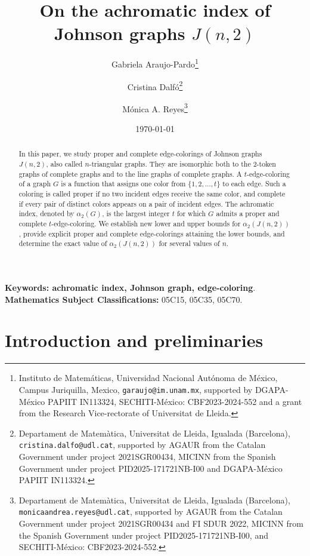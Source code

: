 \documentclass{article}
\title{On the achromatic index of Johnson graphs $J(n,2)$ %
}
\date{\today}
\begin{document}
\author{Gabriela Araujo-Pardo\thanks{Instituto de Matem\'aticas, Universidad Nacional Aut\'onoma de M\'exico, Campus Juriquilla, Mexico, {\tt garaujo@im.unam.mx}, supported by DGAPA-M\'exico PAPIIT IN113324, SECHITI-M\'exico: CBF2023-2024-552 and a grant from the Research Vice-rectorate of Universitat de Lleida.}
    \and
	Cristina Dalf\'o\thanks{Departament de Matem\`atica, Universitat de Lleida, Igualada (Barcelona), {\tt cristina.dalfo@udl.cat}, supported by AGAUR from the Catalan Government under project 2021SGR00434, MICINN from the Spanish Government under project PID2025-171721NB-I00 and DGAPA-M\'exico PAPIIT IN113324.}
    \and
    M\'onica A. Reyes\thanks{Departament de Matem\`atica, Universitat de Lleida, Igualada (Barcelona), {\tt monicaandrea.reyes@udl.cat}, supported by AGAUR from the Catalan Government under project 2021SGR00434 and FI SDUR 2022, MICINN from the Spanish Government under project PID2025-171721NB-I00, and SECHITI-M\'exico: CBF2023-2024-552.}
    }

\maketitle
\begin{abstract}
In this paper, we study proper and complete edge-colorings of Johnson graphs $J(n,2)$, also called $n$-triangular graphs. They are isomorphic both to the 2-token graphs of complete graphs and to the line graphs of complete graphs. A $t$-edge-coloring of a graph $G$ is a function that assigns one color from $\{1,2,\ldots,t\}$ to each edge. Such a coloring is called proper if no two incident edges receive the same color, and complete if every pair of distinct colors appears on a pair of incident edges. The achromatic index, denoted by $\alpha_2(G)$, is the largest integer $t$ for which $G$ admits a proper and complete $t$-edge-coloring. We establish new lower and upper bounds for $\alpha_2(J(n,2))$, provide explicit proper and complete edge-colorings attaining the lower bounds, and determine the exact value of $\alpha_2(J(n,2))$ for several values of $n$.
\end{abstract}

\textbf{Keywords: achromatic index, Johnson graph, edge-coloring}.\\

\noindent \textbf{Mathematics Subject Classifications:} 05C15, 05C35, 05C70.


\section{Introduction and preliminaries}
\end{document}
